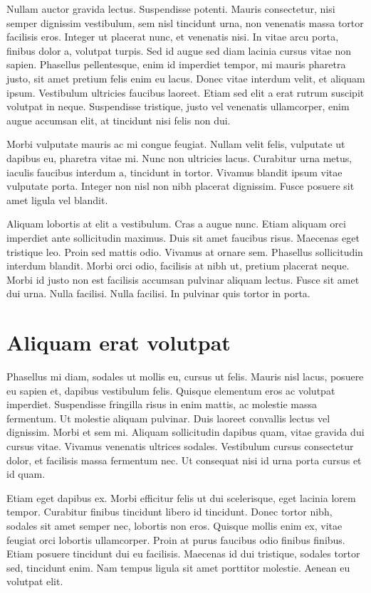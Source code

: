 Nullam auctor gravida lectus. Suspendisse potenti. Mauris consectetur, nisi semper dignissim vestibulum, sem nisl tincidunt urna, non venenatis massa tortor facilisis eros. Integer ut placerat nunc, et venenatis nisi. In vitae arcu porta, finibus dolor a, volutpat turpis. Sed id augue sed diam lacinia cursus vitae non sapien. Phasellus pellentesque, enim id imperdiet tempor, mi mauris pharetra justo, sit amet pretium felis enim eu lacus. Donec vitae interdum velit, et aliquam ipsum. Vestibulum ultricies faucibus laoreet. Etiam sed elit a erat rutrum suscipit volutpat in neque. Suspendisse tristique, justo vel venenatis ullamcorper, enim augue accumsan elit, at tincidunt nisi felis non dui.

Morbi vulputate mauris ac mi congue feugiat. Nullam velit felis, vulputate ut dapibus eu, pharetra vitae mi. Nunc non ultricies lacus. Curabitur urna metus, iaculis faucibus interdum a, tincidunt in tortor. Vivamus blandit ipsum vitae vulputate porta. Integer non nisl non nibh placerat dignissim. Fusce posuere sit amet ligula vel blandit.

Aliquam lobortis at elit a vestibulum. Cras a augue nunc. Etiam aliquam orci imperdiet ante sollicitudin maximus. Duis sit amet faucibus risus. Maecenas eget tristique leo. Proin sed mattis odio. Vivamus at ornare sem. Phasellus sollicitudin interdum blandit. Morbi orci odio, facilisis at nibh ut, pretium placerat neque. Morbi id justo non est facilisis accumsan pulvinar aliquam lectus. Fusce sit amet dui urna. Nulla facilisi. Nulla facilisi. In pulvinar quis tortor in porta.

\section{Aliquam erat volutpat}
Phasellus mi diam, sodales ut mollis eu, cursus ut felis. Mauris nisl lacus, posuere eu sapien et, dapibus vestibulum felis. Quisque elementum eros ac volutpat imperdiet. Suspendisse fringilla risus in enim mattis, ac molestie massa fermentum. Ut molestie aliquam pulvinar. Duis laoreet convallis lectus vel dignissim. Morbi et sem mi. Aliquam sollicitudin dapibus quam, vitae gravida dui cursus vitae. Vivamus venenatis ultrices sodales. Vestibulum cursus consectetur dolor, et facilisis massa fermentum nec. Ut consequat nisi id urna porta cursus et id quam.

Etiam eget dapibus ex. Morbi efficitur felis ut dui scelerisque, eget lacinia lorem tempor. Curabitur finibus tincidunt libero id tincidunt. Donec tortor nibh, sodales sit amet semper nec, lobortis non eros. Quisque mollis enim ex, vitae feugiat orci lobortis ullamcorper. Proin at purus faucibus odio finibus finibus. Etiam posuere tincidunt dui eu facilisis. Maecenas id dui tristique, sodales tortor sed, tincidunt enim. Nam tempus ligula sit amet porttitor molestie. Aenean eu volutpat elit.

